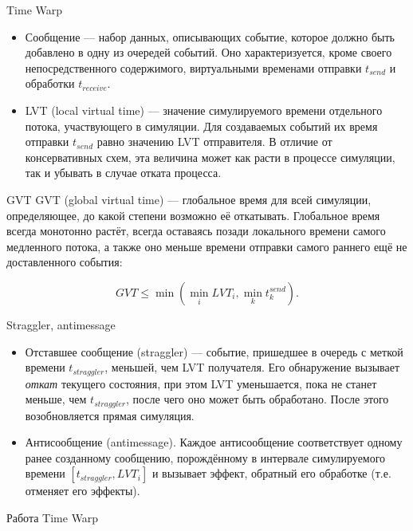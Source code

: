 \documentclass{beamer}
\begin{document}
\begin{frame}{Time Warp}
\begin{itemize}
\item Сообщение — набор данных, описывающих событие, которое должно быть добавлено в одну из очередей событий. Оно
характеризуется, кроме своего непосредственного содержимого, виртуальными временами отправки $t_{send}$ и
обработки $t_{receive}$.
\item LVT (local virtual time) — значение симулируемого времени отдельного потока, участвующего в симуляции. Для создаваемых событий их время отправки $t_{send}$ равно значению LVT отправителя. В отличие от консервативных схем, эта величина может как расти в процессе симуляции, так и убывать в случае отката процесса.
\end{itemize}

\end{frame}


\begin{frame}{GVT}
GVT (global virtual time) — глобальное время для всей симуляции, определяющее, до какой степени возможно её откатывать. Глобальное время всегда монотонно растёт, всегда оставаясь позади локального времени самого медленного потока, а также оно меньше времени отправки самого раннего ещё не доставленного события:

$$GVT \leq \min \left( \min\limits_{i} LVT_{i}, \min\limits_{k} t^{send}_k  \right).$$
\end{frame}

\begin{frame}{Straggler, antimessage}
\begin{itemize}
\item Отставшее сообщение (straggler) — событие, пришедшее в очередь с меткой времени $t_{straggler}$, меньшей, чем LVT получателя. Его обнаружение вызывает \textit{откат} текущего состояния, при этом LVT уменьшается, пока не станет меньше, чем $t_{straggler}$, после чего оно может быть обработано. После этого возобновляется прямая симуляция.

\item Антисообщение (antimessage). Каждое антисообщение соответствует одному ранее созданному сообщению, порождённому в интервале симулируемого времени $[t_{straggler}, LVT_i]$ и вызывает эффект, обратный его обработке (т.е. отменяет его эффекты).
\end{itemize}

\end{frame}


\begin{frame}{Работа Time Warp}
\centering
 
\end{frame}
\end{document}
